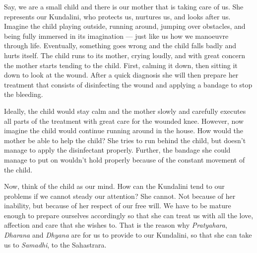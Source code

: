 \documentclass[12pt]{article}
\begin{document}


Say, we are a small child and there is our mother that is taking care of us.
She represents our Kundalini, who protects us, nurtures us, and looks after us.
Imagine the child playing outside, running around, jumping over obstacles, and being fully immersed in its imagination --- just like us how we manoeuvre through life.
Eventually, something goes wrong and the child falls badly and hurts itself.
The child runs to its mother, crying loudly, and with great concern the mother starts tending to the child.
First, calming it down, then sitting it down to look at the wound.
After a quick diagnosis she will then prepare her treatment that consists of disinfecting the wound and applying a bandage to stop the bleeding.

Ideally, the child would stay calm and the mother slowly and carefully executes all parts of the treatment with great care for the wounded knee.
However, now imagine the child would continue running around in the house.
How would the mother be able to help the child?
She tries to run behind the child, but doesn't manage to apply the disinfectant properly.
Further, the bandage she could manage to put on wouldn't hold properly because of the constant movement of the child.

Now, think of the child as our mind.
How can the Kundalini tend to our problems if we cannot steady our attention?
She cannot.
Not because of her inability, but because of her respect of our free will.
We have to be mature enough to prepare ourselves accordingly so that she can treat us with all the love, affection and care that she wishes to.
That is the reason why \textit{Pratyahara}, \textit{Dharana} and \textit{Dhyana} are for us to provide to our Kundalini, so that she can take us to \textit{Samadhi}, to the Sahastrara.

\end{document}
